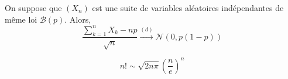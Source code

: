  \begin{application}
    On suppose que $(X_n)$ est une suite de variables aléatoires indépendantes de même loi $\mathcal{B}(p)$. Alors,
    \[ \frac{\sum_{k=1}^{n} X_k - np}{\sqrt{n}} \overset{(d)}{\longrightarrow} \mathcal{N}(0, p(1-p)) \]
  \end{application}


  \begin{application}
    \[ n! \sim \sqrt{2n\pi} \left(\frac{n}{e} \right)^n \]
  \end{application}

